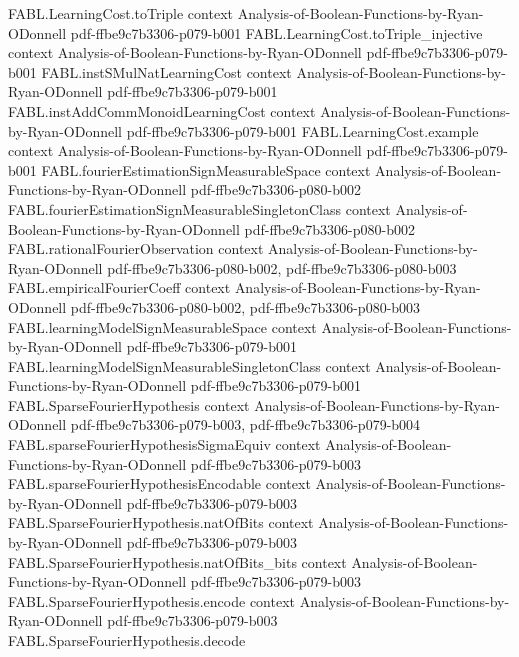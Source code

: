 \begin{theorem}
  {FABL.LearningCost.toTriple}
  {context}
  {Analysis-of-Boolean-Functions-by-Ryan-ODonnell}
  {pdf-ffbe9c7b3306-p079-b001}
\proofstep
  {FABL.LearningCost.toTriple_injective}
  {context}
  {Analysis-of-Boolean-Functions-by-Ryan-ODonnell}
  {pdf-ffbe9c7b3306-p079-b001}
\proofstep
  {FABL.instSMulNatLearningCost}
  {context}
  {Analysis-of-Boolean-Functions-by-Ryan-ODonnell}
  {pdf-ffbe9c7b3306-p079-b001}
\proofstep
  {FABL.instAddCommMonoidLearningCost}
  {context}
  {Analysis-of-Boolean-Functions-by-Ryan-ODonnell}
  {pdf-ffbe9c7b3306-p079-b001}
\proofstep
  {FABL.LearningCost.example}
  {context}
  {Analysis-of-Boolean-Functions-by-Ryan-ODonnell}
  {pdf-ffbe9c7b3306-p079-b001}
\proofstep
  {FABL.fourierEstimationSignMeasurableSpace}
  {context}
  {Analysis-of-Boolean-Functions-by-Ryan-ODonnell}
  {pdf-ffbe9c7b3306-p080-b002}
\proofstep
  {FABL.fourierEstimationSignMeasurableSingletonClass}
  {context}
  {Analysis-of-Boolean-Functions-by-Ryan-ODonnell}
  {pdf-ffbe9c7b3306-p080-b002}
\proofstep
  {FABL.rationalFourierObservation}
  {context}
  {Analysis-of-Boolean-Functions-by-Ryan-ODonnell}
  {pdf-ffbe9c7b3306-p080-b002,
    pdf-ffbe9c7b3306-p080-b003}
\proofstep
  {FABL.empiricalFourierCoeff}
  {context}
  {Analysis-of-Boolean-Functions-by-Ryan-ODonnell}
  {pdf-ffbe9c7b3306-p080-b002,
    pdf-ffbe9c7b3306-p080-b003}
\proofstep
  {FABL.learningModelSignMeasurableSpace}
  {context}
  {Analysis-of-Boolean-Functions-by-Ryan-ODonnell}
  {pdf-ffbe9c7b3306-p079-b001}
\proofstep
  {FABL.learningModelSignMeasurableSingletonClass}
  {context}
  {Analysis-of-Boolean-Functions-by-Ryan-ODonnell}
  {pdf-ffbe9c7b3306-p079-b001}
\proofstep
  {FABL.SparseFourierHypothesis}
  {context}
  {Analysis-of-Boolean-Functions-by-Ryan-ODonnell}
  {pdf-ffbe9c7b3306-p079-b003,
    pdf-ffbe9c7b3306-p079-b004}
\proofstep
  {FABL.sparseFourierHypothesisSigmaEquiv}
  {context}
  {Analysis-of-Boolean-Functions-by-Ryan-ODonnell}
  {pdf-ffbe9c7b3306-p079-b003}
\proofstep
  {FABL.sparseFourierHypothesisEncodable}
  {context}
  {Analysis-of-Boolean-Functions-by-Ryan-ODonnell}
  {pdf-ffbe9c7b3306-p079-b003}
\proofstep
  {FABL.SparseFourierHypothesis.natOfBits}
  {context}
  {Analysis-of-Boolean-Functions-by-Ryan-ODonnell}
  {pdf-ffbe9c7b3306-p079-b003}
\proofstep
  {FABL.SparseFourierHypothesis.natOfBits_bits}
  {context}
  {Analysis-of-Boolean-Functions-by-Ryan-ODonnell}
  {pdf-ffbe9c7b3306-p079-b003}
\proofstep
  {FABL.SparseFourierHypothesis.encode}
  {context}
  {Analysis-of-Boolean-Functions-by-Ryan-ODonnell}
  {pdf-ffbe9c7b3306-p079-b003}
\proofstep
  {FABL.SparseFourierHypothesis.decode}

\end{theorem}
